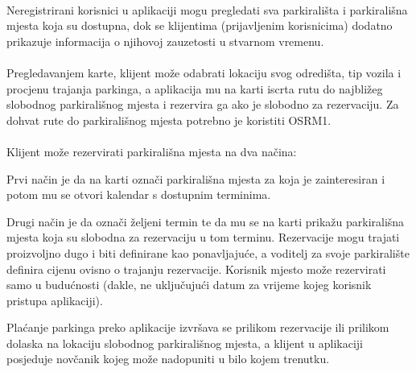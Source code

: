 \paragraph*{}{Neregistrirani korisnici u aplikaciji mogu pregledati sva parkirališta i parkirališna mjesta koja su dostupna, dok se klijentima (prijavljenim korisnicima) dodatno prikazuje informacija o njihovoj zauzetosti u stvarnom vremenu.}
\paragraph*{}{Pregledavanjem karte, klijent može odabrati lokaciju svog odredišta, tip vozila i procjenu trajanja parkinga, a aplikacija mu na karti iscrta rutu do najbližeg slobodnog parkirališnog mjesta i rezervira ga ako je slobodno za rezervaciju. Za dohvat rute do parkirališnog mjesta potrebno je koristiti OSRM1.}

\paragraph*{}Klijent može rezervirati parkirališna mjesta na dva načina:
\begin{packed_item}
	\item{
		Prvi način je da na karti označi parkirališna mjesta za koja je zainteresiran i potom mu se otvori kalendar s dostupnim terminima.
	}
	\item{
		Drugi način je da označi željeni termin te da mu se na karti prikažu parkirališna mjesta koja su slobodna za rezervaciju u tom terminu. Rezervacije mogu trajati proizvoljno dugo i biti definirane kao ponavljajuće, a voditelj za svoje parkiralište definira cijenu ovisno o trajanju rezervacije. Korisnik mjesto može rezervirati samo u budućnosti (dakle, ne uključujući datum za vrijeme kojeg korisnik pristupa aplikaciji).
	}
\end{packed_item}


Plaćanje parkinga preko aplikacije izvršava se prilikom rezervacije ili prilikom dolaska na lokaciju slobodnog parkirališnog mjesta, a klijent u aplikaciji posjeduje novčanik kojeg može nadopuniti u bilo kojem trenutku.




\eject

